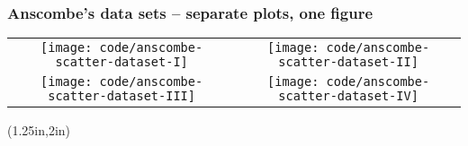 \documentclass{beamer}
\newcommand{\key}[1]{\textcolor{keyred}{{\bf #1}}}
\begin{document}

\begin{frame}
\frametitle{Anscombe's data sets -- separate plots, one figure}
\begin{center}
\begin{tabular}{cc}
\texttt{[image: code/anscombe-scatter-dataset-I]} &
\texttt{[image: code/anscombe-scatter-dataset-II]} \\
\texttt{[image: code/anscombe-scatter-dataset-III]} &
\texttt{[image: code/anscombe-scatter-dataset-IV]} \\
\end{tabular}
\end{center}
\begin{textblock*}{4.5in}(1.25in,2in)
\begin{minipage}{0.75\textwidth}
\visible<2->{\key{But \dots}}
\end{minipage}
\end{textblock*}
\end{frame}
\end{document}
